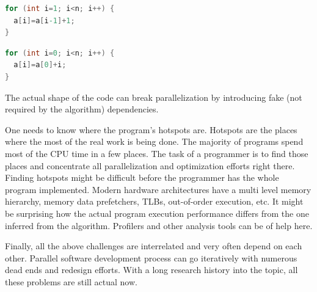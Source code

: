 \begin{description}[style=unboxed,leftmargin=0cm]
\begin{minipage}[t]{0.50\linewidth}
\begin{lstlisting}[caption={Non-parallelizable loop with planted loop-carried data dependence.},label={lst:code_sample_data_dependence},language=C]
for (int i=1; i<n; i++) {
  a[i]=a[i-1]+1;
}
\end{lstlisting}
\end{minipage}
\begin{minipage}[t]{0.50\linewidth}
\begin{lstlisting}[caption={Parallelizable loop free of any data dependencies.}, label={lst:code_sample_no_data_dependence},language=C]
for (int i=0; i<n; i++) {
  a[i]=a[0]+i;
}
\end{lstlisting}
\end{minipage}

The actual shape of the code can break parallelization by introducing fake (not required by the algorithm) dependencies.
\item[Performance analysis and tuning] One needs to know where the program's hotspots are. Hotspots are the places where the most of the real work is being done. The majority of programs spend most of the CPU time in a few places. The task of a programmer is to find those places and concentrate all parallelization and optimization efforts right there. Finding hotspots might be difficult before the programmer has the whole program implemented. Modern hardware architectures have a multi level memory hierarchy, memory data prefetchers, TLBs, out-of-order execution, etc. It might be surprising how the actual program execution performance differs from the one inferred from the algorithm. Profilers and other analysis tools can be of help here.
\end{description}
\quad Finally, all the above challenges are interrelated and very often depend on each other. Parallel software development process can go iteratively with numerous dead ends and redesign efforts. With a long research history into the topic, all these problems are still actual now.


